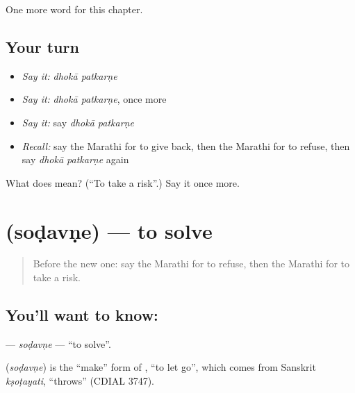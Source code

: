 \begin{grammarlens}[title={What you've built}]
One more word for this chapter.
\end{grammarlens}

\subsection*{Your turn}
\begin{itemize}
\raggedright
  \item \emph{Say it:} \emph{dhokā patkarṇe}
  \item \emph{Say it:} \emph{dhokā patkarṇe}, once more
  \item \emph{Say it:} say \emph{dhokā patkarṇe}
  \item \emph{Recall:} say the Marathi for to give back, then the Marathi for to refuse, then say \emph{dhokā patkarṇe} again
\end{itemize}

\begin{tcolorbox}[breakable,colback=teal!4,colframe=teal!35!black,title={Before you move on}]
What does   mean? (\textquotedblleft{}To take a risk\textquotedblright{}.) Say it once more.
\end{tcolorbox}
\section[\texorpdfstring{\mr{सोडवणे} (soḍavṇe)}{सोडवणे (soḍavṇe)}]{ (soḍavṇe) — to solve}

\label{lesson:MR-C226-sodavne}



\begin{quote}
Before the new one: say the Marathi for to refuse, then the Marathi for to take a risk.
\end{quote}

\subsection*{You'll want to know: }
\textbf{} — \emph{soḍavṇe} — \textquotedblleft{}to solve\textquotedblright{}.

\begin{cousinweb}
\textbf{} (\emph{soḍavṇe}) is the \textquotedblleft{}make\textquotedblright{} form of \textbf{}, \textquotedblleft{}to let go\textquotedblright{}, which comes from Sanskrit \emph{kṣoṭayati}, \textquotedblleft{}throws\textquotedblright{} (CDIAL 3747).
\end{cousinweb}

